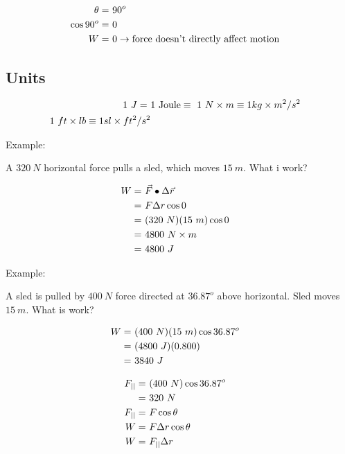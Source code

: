 	\begin{align}
		\theta = \ &90^{o}& \notag \\
		\cos 90^{o} = \ &0& \notag \\
		W = \ &0 \to \text{force doesn't directly affect motion}& \notag
	\end{align}

	\subsection{Units}

	\begin{align}
		1 \ J = \ &1 \ \text{Joule} \equiv \ 1 \ N \times m \equiv 1 kg \times m^{2}/s^{2}& \notag \\
		1 \ ft \times lb \equiv 1 sl \times ft^{2}/s^{2}& \notag
	\end{align}

	Example:

	A $320 \ N$ horizontal force pulls a sled, which moves $15 \ m$. What i work?

	\begin{align}
		W = \ &\vec{F} \bullet \Delta \vec{r}& \notag \\
		= \ &F \Delta r \cos 0& \notag \\
		= \ &(320 \ N) (15 \ m) \cos 0& \notag \\
		= \ &4800 \ N \times m& \notag \\
		= \ &4800 \ J& \notag
	\end{align}

	Example:

	A sled is pulled by $400 \ N$ force directed at $36.87^{o}$ above horizontal. Sled moves $15 \ m$. What is work?

	\begin{align}
		W = \ &(400 \ N) (15 \ m) \cos 36.87^{o}& \notag \\
		= \ &(4800 \ J) (0.800)& \notag \\
		= \ &3840 \ J& \notag
	\end{align}

	\begin{align}
		F_{||} = \ &(400 \ N) \cos 36.87^{o}& \notag \\
		= \ &320 \ N& \notag \\
		F_{||} = \ &F \cos \theta& \notag \\
		W = \ &F \Delta r \cos \theta& \notag \\
		W = \ &F_{||} \Delta r& \notag
	\end{align}

